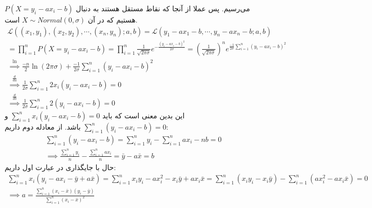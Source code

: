 می‌رسیم. پس عملا از آنجا که نقاط مستقل هستند به دنبال
$P(X = y_i - ax_i - b)$
هستیم که در آن
$X \sim Normal(0, \sigma)$
است.
\begin{gather*}
    \mathcal{L}((x_1,y_1), (x_2,y_2), \cdots, (x_n,y_n); a, b) = \mathcal{L}(y_1 - ax_1 - b, \cdots, y_n - ax_n - b; a, b)\\
    = \prod_{i=1}^n P(X = y_i - ax_i - b) = \prod_{i=1}^n \frac{1}{\sqrt{2 \pi \sigma}} e^{-\frac{(y_i - ax_i - b)^2}{2\sigma}} =
    (\frac{1}{\sqrt{2 \pi \sigma}})^n e^{\frac{-1}{2\sigma} \sum_{i=1}^n (y_i - ax_i - b)^2}\\
    \stackrel{\ln}{\implies} \frac{-n}{2}\ln(2 \pi \sigma) + \frac{-1}{2\sigma} \sum_{i=1}^n (y_i - ax_i - b)^2\\
    \stackrel{\frac{d}{d a}}{\implies} \frac{1}{2\sigma} \sum_{i=1}^n 2x_i (y_i - ax_i - b) = 0\\
    \stackrel{\frac{d}{d b}}{\implies} \frac{1}{2\sigma} \sum_{i=1}^n 2 (y_i - ax_i - b) = 0
\end{gather*}
این بدین معنی است که باید
$\sum_{i=1}^n x_i (y_i - ax_i - b) = 0$
و
$\sum_{i=1}^n (y_i - ax_i - b) = 0$
باشد. از معادله دوم داریم:
\begin{gather*}
    \sum_{i=1}^n (y_i - ax_i - b) = \sum_{i=1}^n y_i - \sum_{i=1}^n ax_i - nb = 0\\
    \implies \frac{\sum_{i=1}^n y_i}{n} - \frac{\sum_{i=1}^n ax_i}{n} = \bar{y} - a\bar{x} = b
\end{gather*}
حال با جایگذاری در عبارت اول داریم:
\begin{gather*}
    \sum_{i=1}^n x_i (y_i - ax_i - \bar{y} + a\bar{x}) = \sum_{i=1}^n x_i y_i - ax_i^2 - x_i\bar{y} + ax_i\bar{x}
    = \sum_{i=1}^n (x_i y_i - x_i\bar{y}) - \sum_{i=1}^n (ax_i^2 - ax_i\bar{x}) = 0\\
    \implies a = \frac{\sum_{i=1}^{n} (x_i-\bar{x})(y_i-\bar{y})}{\sum_{i=1}^n (x_i-\bar{x})^2}
\end{gather*}
